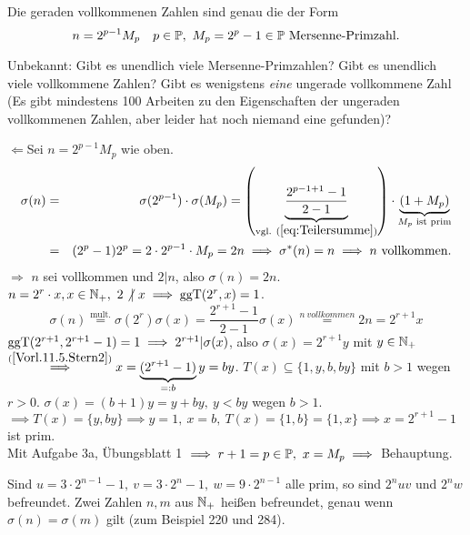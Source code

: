 \documentclass[a4paper,twoside,DIV15,BCOR12mm]{scrbook}
\begin{document}
\begin{satz}
    Die geraden vollkommenen Zahlen sind genau die der Form
    $$
    n=2^{p-1} M_p\quad p\in \mathbb{P},\ M_p=2^p-1 \in \mathbb{P} \text{
    Mersenne-Primzahl}.
    $$
\end{satz}
Unbekannt: Gibt es unendlich viele Mersenne-Primzahlen? Gibt es
unendlich viele vollkommene Zahlen? Gibt es wenigstens \emph{eine}
ungerade vollkommene Zahl (Es gibt mindestens 100 Arbeiten zu den
Eigenschaften der ungeraden vollkommenen Zahlen, aber leider hat
noch niemand eine gefunden)?
\begin{beweis}\glqq $\Leftarrow$\grqq\space Sei $n=2^{p-1}M_p$ wie oben.
    \begin{eqnarray*}
        \sigma(n)&=&\sigma(2^{p-1}) \cdot
        \sigma(M_p)=\left(\underbrace{\frac{2^{p-1+1}-1}{2-1}}_{\text{vgl. }(\ref{eq:Teilersumme})}\right) \cdot \underbrace{(1+M_p)}_{M_p\text{ ist prim}}\\
        &=& (2^p-1)2^p=2\cdot 2^{p-1} \cdot M_p = 2n \implies \sigma^*(n)=n \implies n \text{
        vollkommen.}
    \end{eqnarray*}
    \glqq $\Rightarrow$
    \grqq\space $n$ sei vollkommen und $2|n$, also
    $\sigma(n)=2n$. $n=2^r \cdot x, x \in \mathbb{N}_+,\ 2 \not|\ x \implies
    \mathop{\rm ggT}\nolimits(2^r,x)=1$.
    \begin{equation}\label{Vorl.11.5.Stern2}
        \sigma(n)\stackrel{\text{mult.}}{=}\sigma(2^r)\sigma(x)=\frac{2^{r+1}-1}{2-1}\sigma(x)
        \stackrel{n \ vollkommen}{=}2n=2^{r+1}x
    \end{equation}
    $\mathop{\rm ggT}\nolimits(2^{r+1},2^{r+1}-1)=1 \implies 2^{r+1}|\sigma(x)$, also
    $\sigma(x)=2^{r+1}y$ mit $y\in \mathbb{N}_+$\\$
    \stackrel{(\ref{Vorl.11.5.Stern2})}{\implies} x=\underbrace{(2^{r+1}-1)}_{=:b}y
    =by$. $T(x) \subseteq \{1,y,b,by\}$ mit $b>1$ wegen $r>0$.
    $\sigma(x)=(b+1)y=y+by,\ y<by$ wegen $b>1$.\\
    $\implies T(x)=\{y,by\}\implies y=1,\ x=b,\ T(x)=\{1,b\}=\{1,x\}
    \implies x=2^{r+1}-1$ ist prim.\\
    Mit Aufgabe 3a, Übungsblatt 1 $\implies r+1=p \in \mathbb{P},\ x=M_p\implies$ Behauptung.
\end{beweis}
\begin{satz}
Sind $u=3\cdot 2^{n-1}-1,\ v=3\cdot 2^n -1,\ w=9\cdot 2^{n-1}$ alle
prim, so sind $2^n uv$ und $2^n w$ befreundet. Zwei Zahlen $n,m$ aus
$\mathbb{N}_+$ heißen befreundet, genau wenn $\sigma(n)=\sigma(m)$ gilt (zum Beispiel 220 und 284).
\end{satz}
\end{document}
